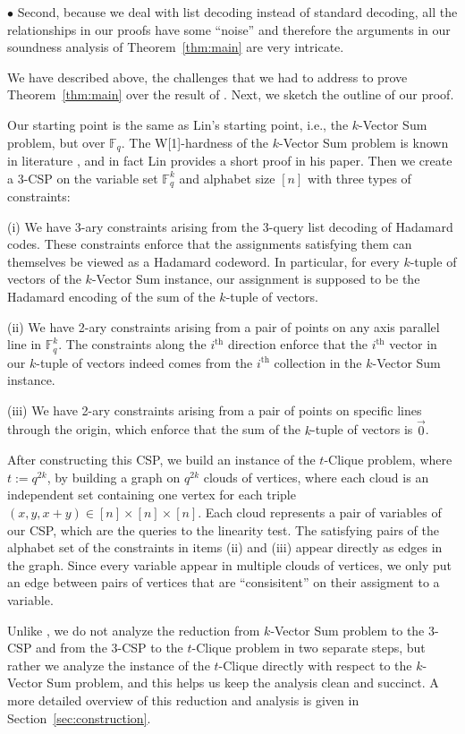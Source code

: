 \documentclass[11pt]{article}
\newcommand{\F}{\mathbb{F}}
\begin{document}
$\bullet$ Second, because we deal with list decoding instead of standard decoding, all the relationships in our proofs have some ``noise'' and therefore the arguments in our soundness analysis of Theorem~\ref{thm:main} are very intricate. 

We have described above, the challenges that we had to address to prove Theorem~\ref{thm:main} over the result of \cite{L21}. Next, we sketch the outline of our proof.

Our starting point is the same as Lin's starting point, i.e., the $k$-Vector Sum problem, but over $\F_q$. The W[1]-hardness of the $k$-Vector Sum problem is known in literature \cite{ALW13}, and in fact Lin provides a short proof in his paper. Then we create a 3-CSP on the variable set $\F_q^k$ and alphabet size $[n]$ with three types of constraints:

(i) We have 3-ary constraints arising from the 3-query list decoding of Hadamard codes. These constraints enforce that the assignments satisfying them  can themselves be viewed as a Hadamard codeword.  In particular, for every $k$-tuple of vectors of the $k$-Vector Sum  instance, our assignment is supposed to be the Hadamard encoding of the sum of the $k$-tuple of vectors. 

(ii) We have 2-ary constraints arising from a pair of points on any  axis parallel line in $\F_q^k$. The constraints along the $i^{\text{th}}$ direction enforce  that the  $i^{\text{th}}$  vector in our $k$-tuple of vectors indeed comes from  the  $i^{\text{th}}$ collection in the $k$-Vector Sum  instance. 

(iii) We have 2-ary constraints arising from a pair of points on specific lines through the origin, which enforce that the  sum of the $k$-tuple of vectors 
is $\vec{0}$.

After constructing this CSP, we build an instance of the $t$-Clique problem, where $t:=q^{2k}$, by building a graph on $q^{2k}$ clouds of vertices, where each cloud is an independent set containing one vertex for each triple $(x,y,x+y)\in[n]\times [n]\times [n]$. Each cloud represents a pair of variables of our CSP, which are the queries to the linearity test. The satisfying pairs of the alphabet set of the constraints in items (ii) and (iii) appear directly as edges in the graph. Since every variable appear in multiple clouds of vertices, we only put an edge between pairs of vertices that are ``consisitent'' on their assigment to a variable. 

Unlike \cite{L21}, we do not analyze the reduction from $k$-Vector Sum problem to the 3-CSP and from the 3-CSP to the $t$-Clique problem in two separate steps, but rather we analyze the instance of the $t$-Clique directly with respect to the $k$-Vector Sum problem, and this helps us keep the analysis clean and succinct. 
A more detailed overview of this reduction and analysis  is given in Section~\ref{sec:construction}. 
\end{document}
